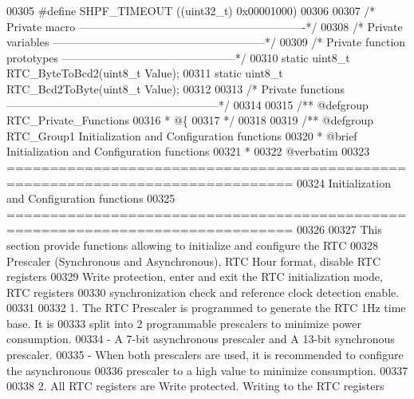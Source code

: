 \begin{DoxyCode}
00305 \textcolor{preprocessor}{#}\textcolor{preprocessor}{define} \textcolor{preprocessor}{SHPF\_TIMEOUT}             \textcolor{preprocessor}{(}\textcolor{preprocessor}{(}\textcolor{preprocessor}{uint32\_t}\textcolor{preprocessor}{)} 0x00001000\textcolor{preprocessor}{)}
00306 
00307 \textcolor{comment}{/* Private macro -------------------------------------------------------------*/}
00308 \textcolor{comment}{/* Private variables ---------------------------------------------------------*/}
00309 \textcolor{comment}{/* Private function prototypes -----------------------------------------------*/}
00310 \textcolor{keyword}{static} uint8\_t RTC_ByteToBcd2(uint8\_t Value);
00311 \textcolor{keyword}{static} uint8\_t RTC_Bcd2ToByte(uint8\_t Value);
00312 
00313 \textcolor{comment}{/* Private functions ---------------------------------------------------------*/}
00314 
00315 \textcolor{comment}{/** @defgroup RTC\_Private\_Functions}
00316 \textcolor{comment}{  * @\{}
00317 \textcolor{comment}{  */}
00318 
00319 \textcolor{comment}{/** @defgroup RTC\_Group1 Initialization and Configuration functions}
00320 \textcolor{comment}{ *  @brief   Initialization and Configuration functions }
00321 \textcolor{comment}{ *}
00322 \textcolor{comment}{@verbatim   }
00323 \textcolor{comment}{ ===============================================================================}
00324 \textcolor{comment}{                 Initialization and Configuration functions}
00325 \textcolor{comment}{ ===============================================================================}
00326 \textcolor{comment}{}
00327 \textcolor{comment}{  This section provide functions allowing to initialize and configure the RTC}
00328 \textcolor{comment}{  Prescaler (Synchronous and Asynchronous), RTC Hour format, disable RTC registers}
00329 \textcolor{comment}{  Write protection, enter and exit the RTC initialization mode, RTC registers}
00330 \textcolor{comment}{  synchronization check and reference clock detection enable.}
00331 \textcolor{comment}{  }
00332 \textcolor{comment}{  1. The RTC Prescaler is programmed to generate the RTC 1Hz time base. It is}
00333 \textcolor{comment}{     split into 2 programmable prescalers to minimize power consumption.}
00334 \textcolor{comment}{     - A 7-bit asynchronous prescaler and A 13-bit synchronous prescaler.}
00335 \textcolor{comment}{     - When both prescalers are used, it is recommended to configure the asynchronous}
00336 \textcolor{comment}{       prescaler to a high value to minimize consumption.}
00337 \textcolor{comment}{}
00338 \textcolor{comment}{  2. All RTC registers are Write protected. Writing to the RTC registers}

\end{DoxyCode}
